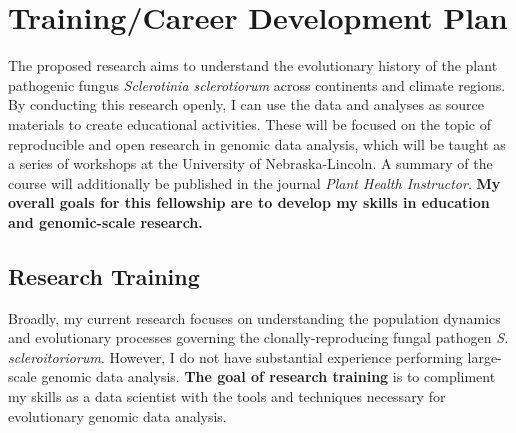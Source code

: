 \documentclass[12pt,letterpaper]{article}
\title{\ruleline{Project Narrative}}
\begin{document}
\maketitle

\section{Training/Career Development Plan}




The proposed research aims to understand the evolutionary history of the plant pathogenic fungus \textit{Sclerotinia sclerotiorum} across continents and climate regions. 
By conducting this research openly, I can use the data and analyses as source materials to create educational activities. 
These will be focused on the topic of reproducible and open research in genomic data analysis,
which will be taught as a series of workshops at the University of Nebraska-Lincoln. 
A summary of the course will additionally be published in the
journal \textit{Plant Health Instructor}. 
\textbf{My overall goals for this fellowship are to develop my skills in education and genomic-scale research.} 


\subsection{Research Training}

Broadly, my current research focuses on understanding the population dynamics and evolutionary processes governing the clonally-reproducing fungal pathogen \textit{S. scleroitoriorum}.
However, I do not have substantial experience performing large-scale genomic data analysis. \textbf{The goal of research training} is to compliment my skills as a data scientist with the tools and techniques necessary for evolutionary genomic data analysis. 
\end{document}
